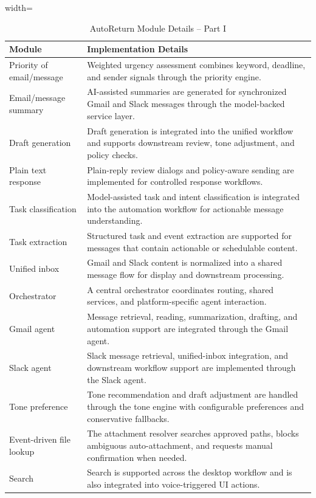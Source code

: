 \begin{table}[!htbp]
\centering
\caption{AutoReturn Module Details -- Part I}
\label{tab:implementation}
\footnotesize
\renewcommand{\arraystretch}{1.15}
\setlength{\tabcolsep}{5pt}
\begin{adjustbox}{width=\textwidth}
\begin{tabular}{|>{\raggedright\arraybackslash}p{4.8cm}|>{\raggedright\arraybackslash}p{8.7cm}|}
\hline
\textbf{Module} & \textbf{Implementation Details} \\
\hline
Priority of email/message & Weighted urgency assessment combines keyword, deadline, and sender signals through the priority engine. \\
\hline
Email/message summary & AI-assisted summaries are generated for synchronized Gmail and Slack messages through the model-backed service layer. \\
\hline
Draft generation & Draft generation is integrated into the unified workflow and supports downstream review, tone adjustment, and policy checks. \\
\hline
Plain text response & Plain-reply review dialogs and policy-aware sending are implemented for controlled response workflows. \\
\hline
Task classification & Model-assisted task and intent classification is integrated into the automation workflow for actionable message understanding. \\
\hline
Task extraction & Structured task and event extraction are supported for messages that contain actionable or schedulable content. \\
\hline
Unified inbox & Gmail and Slack content is normalized into a shared message flow for display and downstream processing. \\
\hline
Orchestrator & A central orchestrator coordinates routing, shared services, and platform-specific agent interaction. \\
\hline
Gmail agent & Message retrieval, reading, summarization, drafting, and automation support are integrated through the Gmail agent. \\
\hline
Slack agent & Slack message retrieval, unified-inbox integration, and downstream workflow support are implemented through the Slack agent. \\
\hline
Tone preference & Tone recommendation and draft adjustment are handled through the tone engine with configurable preferences and conservative fallbacks. \\
\hline
Event-driven file lookup & The attachment resolver searches approved paths, blocks ambiguous auto-attachment, and requests manual confirmation when needed. \\
\hline
Search & Search is supported across the desktop workflow and is also integrated into voice-triggered UI actions. \\
\hline
\end{tabular}
\end{adjustbox}
\end{table}

